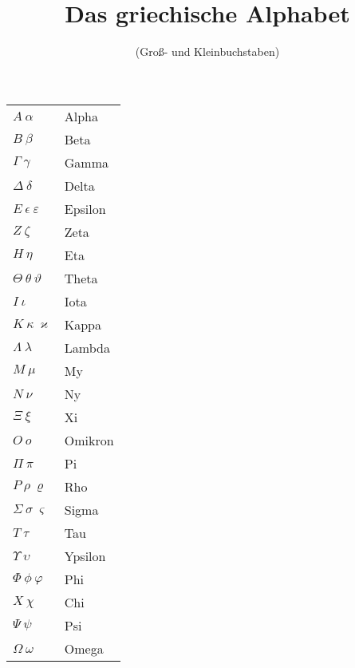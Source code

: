 \documentclass[a4paper,12pt]{article}
\begin{document}
\title{Das griechische Alphabet}
\author{(Groß- und Kleinbuchstaben)}
\date{}
\maketitle

\parindent0pt
\pagestyle{empty}\thispagestyle{empty}

\begin{center}
\begin{tabular}{ll}
$A~\alpha$ & Alpha \\
$B~\beta$ & Beta \\
$\Gamma~\gamma$ & Gamma \\
$\Delta~\delta$ & Delta \\
$E~\epsilon~\varepsilon$ & Epsilon \\
$Z~\zeta$ & Zeta \\
$H~\eta$ & Eta \\
$\Theta~\theta~\vartheta$ & Theta \\
$I~\iota$ & Iota \\
$K~\kappa~\varkappa$ & Kappa \\
$\Lambda~\lambda$ & Lambda \\
$M~\mu$ & My \\
$N~\nu$ & Ny \\
$\Xi~\xi$ & Xi \\
$O~o$ & Omikron \\
$\Pi~\pi$ & Pi \\
$P~\rho~\varrho$ & Rho \\
$\Sigma~\sigma~\varsigma$ & Sigma \\
$T~\tau$ & Tau \\
$\Upsilon~\upsilon$ & Ypsilon \\
$\Phi~\phi~\varphi$ & Phi \\
$X~\chi$ & Chi \\
$\Psi~\psi$ & Psi \\
$\Omega~\omega$ & Omega
\end{tabular}
\end{center}
\end{document}
